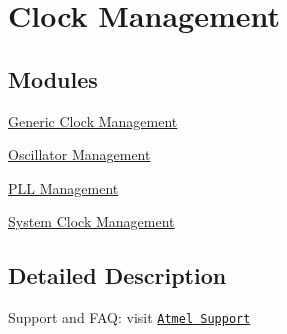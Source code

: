\hypertarget{group__clk__group}{\section{Clock Management}
\label{group__clk__group}
}
\subsection*{Modules}
\begin{DoxyCompactItemize}
\item 
\hyperlink{group__genclk__group}{Generic Clock Management}
\item 
\hyperlink{group__osc__group}{Oscillator Management}
\item 
\hyperlink{group__pll__group}{P\-L\-L Management}
\item 
\hyperlink{group__sysclk__group}{System Clock Management}
\end{DoxyCompactItemize}


\subsection{Detailed Description}
Support and F\-A\-Q\-: visit \href{http://www.atmel.com/design-support/}{\tt Atmel Support} 